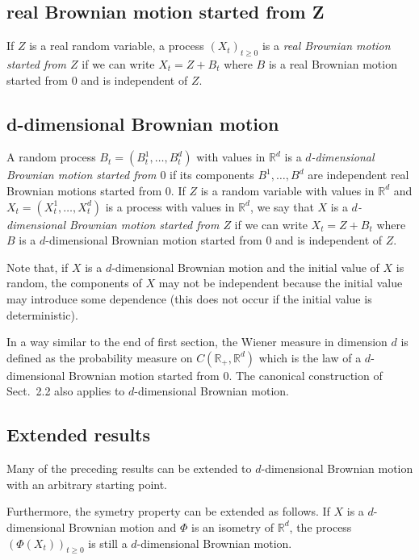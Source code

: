 \documentclass[../Main.tex]{subfiles}
\begin{document}
\subsection{real Brownian motion started from Z}
If $Z$ is a real random variable, a process $(X_t)_{t\geq 0}$ is a \emph{real Brownian motion started from $Z$} if we can write $X_t = Z+B_t$ where $B$ is a real Brownian motion started from $0$ and is independent of $Z$.

\subsection{d-dimensional Brownian motion}
A random process $B_t = (B_t^1,\dots,B_t^d)$ with values in $\mathbb R^d$ is a \emph{$d$-dimensional Brownian motion started from $0$} if its components $B^1,\dots,B^d$ are independent real Brownian motions started from $0$. If $Z$ is a random variable with values in $\mathbb R^d$ and $X_t=(X_t^1,\dots,X_t^d)$ is a process with values in $\mathbb R^d$, we say that $X$ is a \emph{$d$-dimensional Brownian motion started from $Z$} if we can write $X_t = Z+B_t$ where $B$ is a $d$-dimensional Brownian motion started from $0$ and is independent of $Z$.

Note that, if $X$ is a $d$-dimensional Brownian motion and the initial value of $X$ is random, the components of $X$ may not be independent because the initial value may introduce some dependence (this does not occur if the initial value is deterministic).
 
In a way similar to the end of first section, the Wiener measure in dimension $d$ is defined as the probability measure on $C(\mathbb R_+,\mathbb R^d)$ which is the law of a $d$-dimensional Brownian motion started from $0$. The canonical construction of Sect.~2.2 also applies to $d$-dimensional Brownian motion.
 
\subsection{Extended results}
Many of the preceding results can be extended to $d$-dimensional Brownian motion with an arbitrary starting point. 

Furthermore, the symetry property can be extended as follows. If $X$ is a $d$-dimensional Brownian motion and $\Phi$ is an isometry of $\mathbb R^d$, the process $(\Phi(X_t))_{t\geq 0}$ is still a $d$-dimensional Brownian motion.
\end{document}
